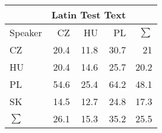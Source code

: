 \begin{tabular}{l|rrr|r}
\hline
 & \multicolumn{3}{c}{Latin Test Text} & \\
\hline
 Speaker   &   CZ &   HU &   PL &   $\sum$ \\
\hline
 CZ        & 20.4 & 11.8 & 30.7 &     21   \\
 HU        & 20.4 & 14.6 & 25.7 &     20.2 \\
 PL        & 54.6 & 25.4 & 64.2 &     48.1 \\
 SK        & 14.5 & 12.7 & 24.8 &     17.3 \\
\hline
 $\sum$   & 26.1 & 15.3 & 35.2 &     25.5 \\
\hline
\end{tabular}